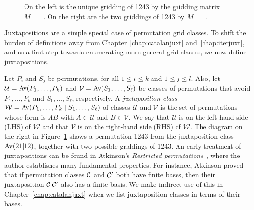 \documentclass[12pt, a4paper, twoside]{report}
\begin{document}
\begin{figure}[!ht]
\begin{center}
\captionsetup{singlelinecheck=off}
\caption{\small On the left is the unique gridding of 1243 by the gridding matrix $M =$~\usebox{\smlmata}. On the right are the two griddings of 1243 by $M =$~\usebox{\smlmatb}.}
\label{fig:gridexample}
\end{center}
\end{figure}

Juxtapositions are a simple special case of permutation grid classes. To shift the burden of definitions away from Chapter~\ref{chap:catalanjuxt} and~\ref{chap:iterjuxt}, and as a first step towards enumerating more general grid classes, we now define juxtapositions.

Let $P_i$ and $S_j$ be permutations, for all $1\leq i\leq k$ and $1 \leq j \leq l$. Also, let $\mathcal{U} = \mathrm{Av}(P_1,\ldots,P_k)$ and $\mathcal{V} = \mathrm{Av}(S_1,\ldots,S_\ell)$ be  classes of permutations that avoid $P_1,\ldots, P_k$ and $S_1,\ldots,S_\ell$, respectively. A \emph{juxtaposition class} $\mathcal{W} = \mathrm{Av}(P_1,\ldots,P_k\mid S_1, \ldots, S_\ell)$ of classes $\mathcal{U}$ and $\mathcal{V}$ is the set of permutations whose form is $AB$ with $A\in \mathcal{U}$ and $B \in \mathcal{V}$. We say that $\mathcal{U}$ is on the left-hand side (LHS) of $\mathcal{W}$ and that $\mathcal{V}$ is on the right-hand side (RHS) of $\mathcal{W}$. The diagram on the right in Figure~\ref{fig:gridexample} shows a permutation 1243 from the juxtaposition class $\mathrm{Av}(21|12)$, together with two possible griddings of 1243. An early treatment of juxtapositions can be found in Atkinson's \emph{Restricted permutations}~\cite{atkinson1997restricted}, where the author establishes many fundamental properties. For instance, Atkinson proved that if permutation classes $\mathcal{C}$ and $\mathcal{C}'$ both have finite bases, then their juxtaposition $\mathcal{C}|\mathcal{C}'$ also has a finite basis. We make indirect use of this in Chapter~\ref{chap:catalanjuxt} when we list juxtaposition classes in terms of their bases.
\end{document}
